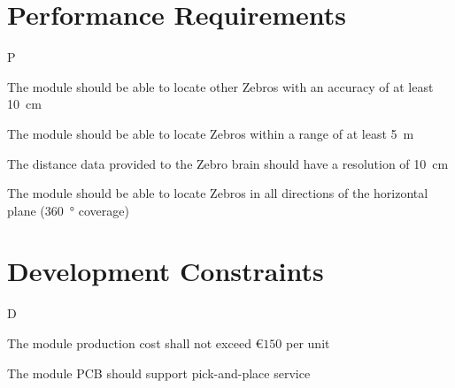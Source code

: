 \section{Performance Requirements}
\begin{reqs}{P}
  \item\label{req:locper} The module should be able to locate other Zebros with an accuracy of at least \SI{10}{\centi\meter}
  \item\label{req:locrange} The module should be able to locate Zebros within a range of at least \SI{5}{\meter}
  \item\label{req:locres} The distance data provided to the Zebro brain should have a resolution of \SI{10}{\centi\meter}
  \item\label{req:omnidir} The module should be able to locate Zebros in all directions of the horizontal plane (\SI{360}{\degree} coverage)
\end{reqs}

\section{Development Constraints}
\begin{reqs}{D}
  \item The module production cost shall not exceed \euro $150$ per unit
  \item The module PCB should support pick-and-place service
\end{reqs}
